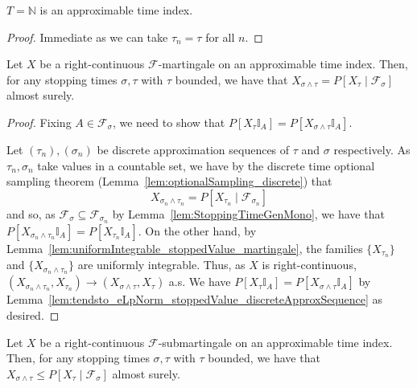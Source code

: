 \begin{lemma}\label{lem:stoppingTime_approximationNat}
  \leanok
  $T = \mathbb{N}$ is an approximable time index.
\end{lemma}
\begin{proof}
  Immediate as we can take \(\tau_n = \tau\) for all \(n\).
\end{proof}

\begin{lemma}\label{lem:optionalSampling}
  \leanok
  Let $X$ be a right-continuous $\mathcal{F}$-martingale on an approximable time index. Then, for
  any stopping times $\sigma, \tau$ with $\tau$ bounded, we have that
  $X_{\sigma \wedge \tau} = P[X_{\tau} \mid \mathcal{F}_{\sigma}]$ almost surely.
\end{lemma}

\begin{proof}
  \leanok
  Fixing $A \in \mathcal{F}_{\sigma}$, we need to show that $P[X_{\tau} \mathbb{I}_A] = P[X_{\sigma \wedge \tau} \mathbb{I}_A]$.

  Let $(\tau_n), (\sigma_n)$ be discrete approximation sequences of $\tau$ and $\sigma$ respectively.
  As $\tau_n, \sigma_n$ take values in a countable set,
  we have by the discrete time optional sampling theorem (Lemma~\ref{lem:optionalSampling_discrete}) that
  $$X_{\sigma_n \wedge \tau_n} = P[X_{\tau_n} \mid \mathcal{F}_{\sigma_n}]$$
  and so, as \(\mathcal{F}_{\sigma} \subseteq \mathcal{F}_{\sigma_n}\) by Lemma~\ref{lem:StoppingTimeGenMono},
  we have that $P[X_{\sigma_n \wedge \tau_n} \mathbb{I}_A] = P[X_{\tau_n} \mathbb{I}_A]$.
  On the other hand, by Lemma~\ref{lem:uniformIntegrable_stoppedValue_martingale}, the families $\{X_{\tau_n}\}$ and $\{X_{\sigma_n \wedge \tau_n}\}$ are uniformly integrable.
  Thus, as $X$ is right-continuous, $(X_{\sigma_n \wedge \tau_n}, X_{\tau_n}) \to (X_{\sigma \wedge \tau}, X_{\tau})$ a.s.
  We have $P[X_{\tau} \mathbb{I}_A] = P[X_{\sigma \wedge \tau} \mathbb{I}_A]$
  by Lemma~\ref{lem:tendsto_eLpNorm_stoppedValue_discreteApproxSequence} as desired.
\end{proof}

\begin{lemma}\label{lem:optionalSamplingSubmartingale}
  \leanok
  Let $X$ be a right-continuous $\mathcal{F}$-submartingale on an approximable time index. Then, for
  any stopping times $\sigma, \tau$ with $\tau$ bounded, we have that
  $X_{\sigma \wedge \tau} \le P[X_{\tau} \mid \mathcal{F}_{\sigma}]$ almost surely.
\end{lemma}

